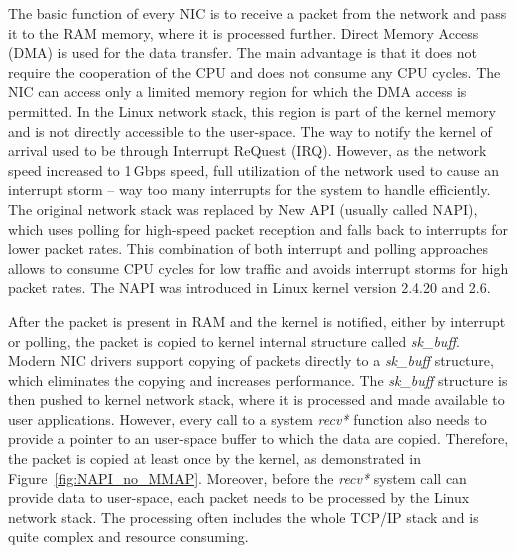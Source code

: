 The basic function of every NIC is to receive a packet from the network and pass it to the RAM memory, where it is processed further. Direct Memory Access (DMA) is used for the data transfer. The main advantage is that it does not require the cooperation of the CPU and does not consume any CPU cycles. The NIC can access only a limited memory region for which the DMA access is permitted. In the Linux network stack, this region is part of the kernel memory and is not directly accessible to the user-space. The way to notify the kernel of arrival used to be through Interrupt ReQuest (IRQ). However, as the network speed increased to 1\,Gbps speed, full utilization of the network used to cause an interrupt storm -- way too many interrupts for the system to handle efficiently. The original network stack was replaced by New API (usually called NAPI), which uses polling for high-speed packet reception and falls back to interrupts for lower packet rates. This combination of both interrupt and polling approaches allows to consume CPU cycles for low traffic and avoids interrupt storms for high packet rates. The NAPI was introduced in Linux kernel version 2.4.20 and 2.6.

After the packet is present in RAM and the kernel is notified, either by interrupt or polling, the packet is copied to kernel internal structure called \emph{sk\_buff}. Modern NIC drivers support copying of packets directly to a \emph{sk\_buff} structure, which eliminates the copying and increases performance. The \emph{sk\_buff} structure is then pushed to kernel network stack, where it is processed and made available to user applications. However, every call to a system \emph{recv*} function also needs to provide a pointer to an user-space buffer to which the data are copied. Therefore, the packet is copied at least once by the kernel, as demonstrated in Figure~\ref{fig:NAPI_no_MMAP}. Moreover, before the \emph{recv*} system call can provide data to user-space, each packet needs to be processed by the Linux network stack. The processing often includes the whole TCP/IP stack and is quite complex and resource consuming.


